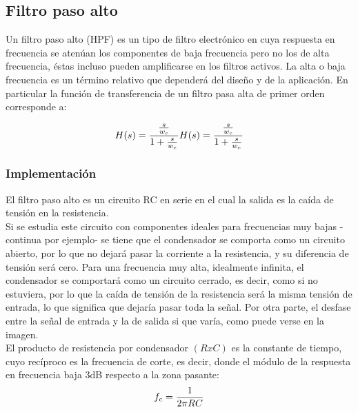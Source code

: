 \documentclass{article}
\begin{document}
\subsection{Filtro paso alto}

Un filtro paso alto (HPF) es un tipo de filtro electrónico en cuya respuesta en frecuencia se atenúan los componentes de baja frecuencia pero no los de alta frecuencia, éstas incluso pueden amplificarse en los filtros activos. La alta o baja frecuencia es un término relativo que dependerá del diseño y de la aplicación. En particular la función de transferencia de un filtro pasa alta de primer orden corresponde a:\citep{FiltroPasoAlto}

\begin{equation}
    {\displaystyle H(s)={{\frac {s}{w_{c}}} \over 1+{\frac {s}{w_{c}}}}} {\displaystyle H(s)={{\frac {s}{w_{c}}} \over 1+{\frac {s}{w_{c}}}}}
\end{equation}

\subsubsection{Implementación}

El filtro paso alto es un circuito RC en serie en el cual la salida es la caída de tensión en la resistencia.\citep{FiltroPasoAlto}\\

Si se estudia este circuito con componentes ideales para frecuencias muy bajas -continua por ejemplo- se tiene que el condensador se comporta como un circuito abierto, por lo que no dejará pasar la corriente a la resistencia, y su diferencia de tensión será cero. Para una frecuencia muy alta, idealmente infinita, el condensador se comportará como un circuito cerrado, es decir, como si no estuviera, por lo que la caída de tensión de la resistencia será la misma tensión de entrada, lo que significa que dejaría pasar toda la señal. Por otra parte, el desfase entre la señal de entrada y la de salida si que varía, como puede verse en la imagen.\citep{FiltroPasoAlto}\\

El producto de resistencia por condensador $(RxC)$ es la constante de tiempo, cuyo recíproco es la frecuencia de corte, es decir, donde el módulo de la respuesta en frecuencia baja 3dB respecto a la zona pasante:\citep{FiltroPasoAlto}\\

\begin{equation}
    {\displaystyle f_{c}={1 \over 2\pi RC}}
\end{equation}
\end{document}

